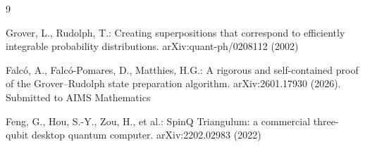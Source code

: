 \documentclass[11pt,a4paper]{article}
\begin{document}
\begin{thebibliography}{9}

Grover, L., Rudolph, T.: Creating superpositions that correspond to
efficiently integrable probability distributions.
arXiv:quant-ph/0208112 (2002)

Falcó, A., Falcó-Pomares, D., Matthies, H.G.:
A rigorous and self-contained proof of the Grover--Rudolph state
preparation algorithm. arXiv:2601.17930 (2026).
Submitted to AIMS Mathematics

Feng, G., Hou, S.-Y., Zou, H., et al.:
SpinQ Triangulum: a commercial three-qubit desktop quantum computer.
arXiv:2202.02983 (2022)

\end{thebibliography}
\end{document}
